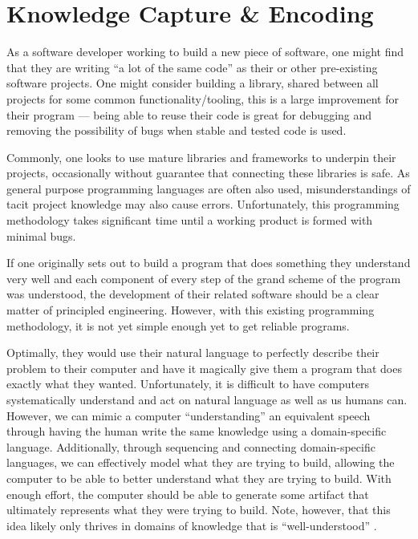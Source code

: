 \section{Knowledge Capture \& Encoding}


As a software developer working to build a new piece of software, one might find
that they are writing ``a lot of the same code'' as their or other pre-existing
software projects. One might consider building a library, shared between all
projects for some common functionality/tooling, this is a large improvement for
their program --- being able to reuse their code is great for debugging and
removing the possibility of bugs when stable and tested code is used.


Commonly, one looks to use mature libraries and frameworks to underpin their
projects, occasionally without guarantee that connecting these libraries is
safe. As general purpose programming languages are often also used,
misunderstandings of tacit project knowledge may also cause errors.
Unfortunately, this programming methodology takes significant time until a
working product is formed with minimal bugs.

If one originally sets out to build a program that does something they
understand very well and each component of every step of the grand scheme of the
program was understood, the development of their related software should be a
clear matter of principled engineering. However, with this existing programming
methodology, it is not yet simple enough yet to get reliable programs.

Optimally, they would use their natural language to perfectly describe their
problem to their computer and have it magically give them a program that does
exactly what they wanted. Unfortunately, it is difficult to have computers
systematically understand and act on natural language as well as us humans can.
However, we can mimic a computer ``understanding'' an equivalent speech through
having the human write the same knowledge using a domain-specific language.
Additionally, through sequencing and connecting domain-specific languages, we
can effectively model what they are trying to build, allowing the computer to be
able to better understand what they are trying to build. With enough effort, the
computer should be able to generate some artifact that ultimately represents
what they were trying to build. Note, however, that this idea likely only
thrives in domains of knowledge that is ``well-understood''
\cite{well-understood}.

